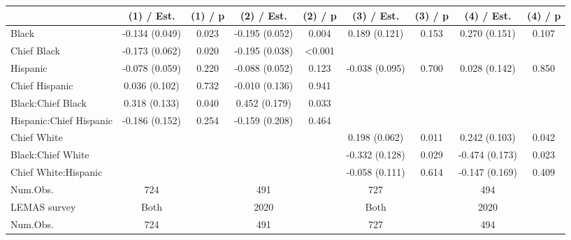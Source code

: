 
\begin{tabular}[t]{lcccccccc}
\toprule
  & (1) / Est. & (1) / p & (2) / Est. & (2) / p & (3) / Est. & (3) / p & (4) / Est. & (4) / p\\
\midrule
Black & -0.134 
(0.049) & 0.023 & -0.195 
(0.052) & 0.004 & 0.189 
(0.121) & 0.153 & 0.270 
(0.151) & 0.107\\
Chief Black & -0.173 
(0.062) & 0.020 & -0.195 
(0.038) & <0.001 &  &  &  & \\
Hispanic & -0.078 
(0.059) & 0.220 & -0.088 
(0.052) & 0.123 & -0.038 
(0.095) & 0.700 & 0.028 
(0.142) & 0.850\\
Chief Hispanic & 0.036 
(0.102) & 0.732 & -0.010 
(0.136) & 0.941 &  &  &  & \\
Black:Chief Black & 0.318 
(0.133) & 0.040 & 0.452 
(0.179) & 0.033 &  &  &  & \\
Hispanic:Chief Hispanic & -0.186 
(0.152) & 0.254 & -0.159 
(0.208) & 0.464 &  &  &  & \\
Chief White &  &  &  &  & 0.198 
(0.062) & 0.011 & 0.242 
(0.103) & 0.042\\
Black:Chief White &  &  &  &  & -0.332 
(0.128) & 0.029 & -0.474 
(0.173) & 0.023\\
Chief White:Hispanic &  &  &  &  & -0.058 
(0.111) & 0.614 & -0.147 
(0.169) & 0.409\\
\midrule
Num.Obs. & 724 &  & 491 &  & 727 &  & 494 \vphantom{1} & \\
LEMAS survey & Both &  & 2020 &  & Both &  & 2020 & \\
Num.Obs. & 724 &  & 491 &  & 727 &  & 494 & \\
\bottomrule
\end{tabular}
